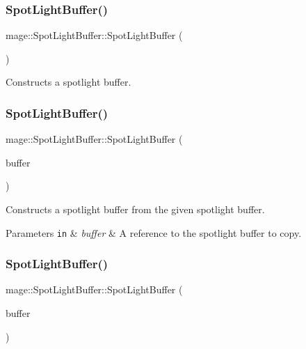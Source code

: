 \subsubsection{\texorpdfstring{Spot\+Light\+Buffer()}{SpotLightBuffer()}\hspace{0.1cm}{\footnotesize\ttfamily [1/3]}}
{\footnotesize\ttfamily mage\+::\+Spot\+Light\+Buffer\+::\+Spot\+Light\+Buffer (\begin{DoxyParamCaption}{ }\end{DoxyParamCaption})}

Constructs a spotlight buffer. \hypertarget{structmage_1_1_spot_light_buffer_a572e805bf8eef2a1183162ae68877ade}{}\label{structmage_1_1_spot_light_buffer_a572e805bf8eef2a1183162ae68877ade} 
\subsubsection{\texorpdfstring{Spot\+Light\+Buffer()}{SpotLightBuffer()}\hspace{0.1cm}{\footnotesize\ttfamily [2/3]}}
{\footnotesize\ttfamily mage\+::\+Spot\+Light\+Buffer\+::\+Spot\+Light\+Buffer (\begin{DoxyParamCaption}\item[{const \hyperlink{structmage_1_1_spot_light_buffer}{Spot\+Light\+Buffer} \&}]{buffer }\end{DoxyParamCaption})\hspace{0.3cm}{\ttfamily [default]}}

Constructs a spotlight buffer from the given spotlight buffer.


\begin{DoxyParams}[1]{Parameters}
\mbox{\tt in}  & {\em buffer} & A reference to the spotlight buffer to copy. \\
\hline
\end{DoxyParams}
\hypertarget{structmage_1_1_spot_light_buffer_a0dd63c65417578b6001b1c7f2195452c}{}\label{structmage_1_1_spot_light_buffer_a0dd63c65417578b6001b1c7f2195452c} 
\subsubsection{\texorpdfstring{Spot\+Light\+Buffer()}{SpotLightBuffer()}\hspace{0.1cm}{\footnotesize\ttfamily [3/3]}}
{\footnotesize\ttfamily mage\+::\+Spot\+Light\+Buffer\+::\+Spot\+Light\+Buffer (\begin{DoxyParamCaption}\item[{\hyperlink{structmage_1_1_spot_light_buffer}{Spot\+Light\+Buffer} \&\&}]{buffer }\end{DoxyParamCaption})\hspace{0.3cm}{\ttfamily [default]}}

